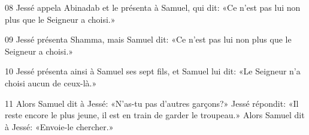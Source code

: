 
08 Jessé appela Abinadab et le présenta à Samuel, qui dit: «Ce n’est pas lui non plus que le Seigneur a choisi.»

09 Jessé présenta Shamma, mais Samuel dit: «Ce n’est pas lui non plus que le Seigneur a choisi.»

10 Jessé présenta ainsi à Samuel ses sept fils, et Samuel lui dit: «Le Seigneur n’a choisi aucun de ceux-là.»

11 Alors Samuel dit à Jessé: «N’as-tu pas d’autres garçons?» Jessé répondit: «Il reste encore le plus jeune, il est en train de garder le troupeau.» Alors Samuel dit à Jessé: «Envoie-le chercher.»